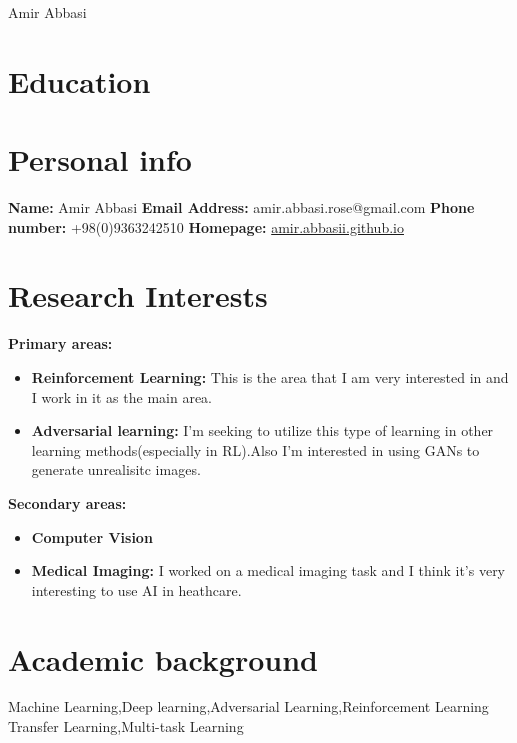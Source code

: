 \documentclass[paper=a4,fontsize=11pt]{scrartcl} %
\newcommand{\MyName}[1]{ %
                \Huge \hfill #1
                \par \normalsize \normalfont}
\newcommand{\MyEmail}[1]{ %
                \small \hfill #1
                \par \normalsize \normalfont}
\newcommand{\NewPart}[1]{\section*{{#1}}}
\begin{document}
\MyName{Amir Abbasi}

\NewPart{Education}



\NewPart{Personal info}
\textbf{Name:} Amir Abbasi \newline
\textbf{Email Address:} amir.abbasi.rose@gmail.com \newline
\textbf{Phone number:} +98(0)9363242510 \newline
\textbf{Homepage:} \href{https://amirabbasii.github.io}{amir.abbasii.github.io} \newline


\NewPart{Research Interests}
\textbf{Primary areas:}
\begin{itemize}
\item \textbf{Reinforcement Learning:} This is the area that I am very interested in and I work in it as the main area. 
\item \textbf{Adversarial learning:} I'm seeking to utilize this type of learning in other learning methods(especially in RL).Also I'm interested in using GANs to generate unrealisitc images.
\end{itemize} \newline
\textbf{Secondary areas:}
\begin{itemize}
\item \textbf{Computer Vision}
\item \textbf{Medical Imaging:} I worked on a medical imaging task and I think it's very interesting to use AI in heathcare.
\end{itemize}

\NewPart{Academic background}
Machine Learning,Deep learning,Adversarial Learning,Reinforcement Learning \newline
Transfer Learning,Multi-task Learning
\end{document}
